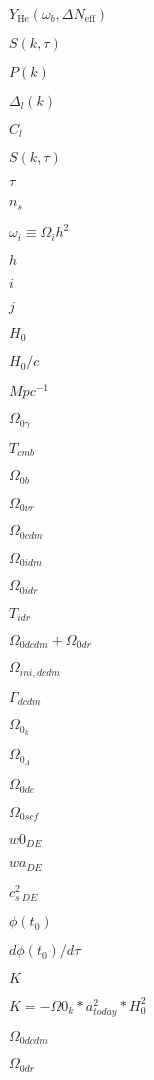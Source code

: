\documentclass{article}
\begin{document}
$ Y_\mathrm{He}(\omega_b, \Delta N_\mathrm{eff})$
\pagebreak

$S(k,\tau)$
\pagebreak

$P(k)$
\pagebreak

$\Delta_l(k)$
\pagebreak

$C_l$
\pagebreak

$S(k, \tau)$
\pagebreak

$\tau$
\pagebreak

$n_s$
\pagebreak

$\omega_i \equiv \Omega_i h^2$
\pagebreak

$h$
\pagebreak

$i$
\pagebreak

$j$
\pagebreak

$ H_0 $
\pagebreak

$H_0/c$
\pagebreak

$ Mpc^{-1} $
\pagebreak

$ \Omega_{0 \gamma} $
\pagebreak

$ T_{cmb} $
\pagebreak

$ \Omega_{0 b} $
\pagebreak

$ \Omega_{0 \nu r} $
\pagebreak

$ \Omega_{0 cdm} $
\pagebreak

$ \Omega_{0 idm} $
\pagebreak

$ \Omega_{0 idr} $
\pagebreak

$ T_{idr} $
\pagebreak

$ \Omega_{0 dcdm}+\Omega_{0 dr} $
\pagebreak

$ \Omega_{ini,dcdm} $
\pagebreak

$ \Gamma_{dcdm} $
\pagebreak

$ \Omega_{0_k} $
\pagebreak

$ \Omega_{0_\Lambda} $
\pagebreak

$ \Omega_{0 de} $
\pagebreak

$ \Omega_{0 scf} $
\pagebreak

$ w0_{DE} $
\pagebreak

$ wa_{DE} $
\pagebreak

$ c^2_{s~DE} $
\pagebreak

$ \phi(t_0) $
\pagebreak

$ d\phi(t_0)/d\tau $
\pagebreak

$ K $
\pagebreak

$ K=-\Omega0_k*a_{today}^2*H_0^2$
\pagebreak

$ \Omega_{0 dcdm} $
\pagebreak

$ \Omega_{0 dr} $
\pagebreak
\end{document}
